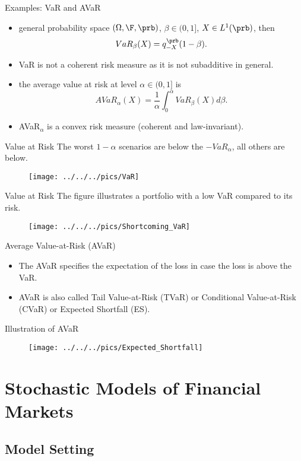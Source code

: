 {Examples: VaR and AVaR}
\begin{itemize}
\item general probability space $(\Omega, \F, \prb)$, $\beta \in (0,1]$, $X\in L^1(\prb)$, then
$$
VaR_\beta(X) = q_{-X}^{\prb}(1-\beta).
$$
 \item VaR is not a coherent risk measure as it is not subadditive in general.
\item the average value at risk at level $\alpha \in (0,1]$ is
$$
AVaR_\alpha(X) = \frac{1}{\alpha} \int_0^\alpha VaR_\beta(X) d\beta.
$$
\item AVaR$_\alpha$ is a convex risk measure (coherent and law-invariant).
\end{itemize}

{Value at Risk}
The worst $1-\alpha$ scenarios are below the $-VaR_\alpha$, all others are below.
\begin{figure}
	\centering
		\texttt{[image: ../../../pics/VaR]}
	\label{fig:VaR}
\end{figure}

{Value at Risk}
The figure illustrates a portfolio with a low VaR compared to its risk.
\begin{figure}
	\centering
		\texttt{[image: ../../../pics/Shortcoming\_VaR]}
	\label{fig:Shortcoming_VaR}
\end{figure}

{Average Value-at-Risk (AVaR) }
\begin{itemize}
\item<1-> The AVaR specifies the expectation of the loss in case the loss is above the VaR.
\item<2-> AVaR is also called Tail Value-at-Risk (TVaR) or Conditional
Value-at-Risk (CVaR) or  Expected Shortfall (ES).
\end{itemize}

{Illustration of AVaR}
\begin{figure}
	\centering
		\texttt{[image: ../../../pics/Expected\_Shortfall]}
	\label{fig:Expected_Shortfall}
\end{figure}

\section{Stochastic Models of Financial Markets}
\subsection{Model Setting}

